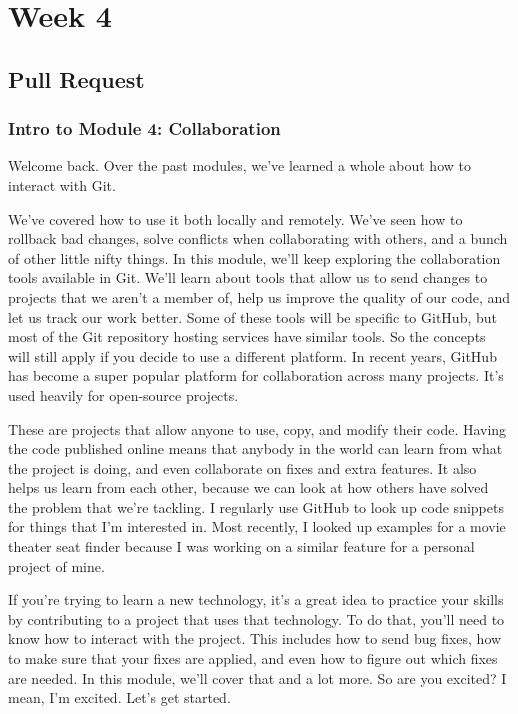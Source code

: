 %
%
%
\chapter{Week 4}

\section{Pull Request}

	\subsection{Intro to Module 4: Collaboration}
	
	Welcome back. Over the past modules, we've learned a whole about how to interact with Git.
	
	We've covered how to use it both locally and remotely. We've seen how to rollback bad changes, solve conflicts when collaborating with others, and a bunch of other little nifty things. In this module, we'll keep exploring the collaboration tools available in Git. We'll learn about tools that allow us to send changes to projects that we aren't a member of, help us improve the quality of our code, and let us track our work better. Some of these tools will be specific to GitHub, but most of the Git repository hosting services have similar tools. So the concepts will still apply if you decide to use a different platform. In recent years, GitHub has become a super popular platform for collaboration across many projects. It's used heavily for open-source projects.
	
	These are projects that allow anyone to use, copy, and modify their code. Having the code published online means that anybody in the world can learn from what the project is doing, and even collaborate on fixes and extra features. It also helps us learn from each other, because we can look at how others have solved the problem that we're tackling. I regularly use GitHub to look up code snippets for things that I'm interested in. Most recently, I looked up examples for a movie theater seat finder because I was working on a similar feature for a personal project of mine.
	
	If you're trying to learn a new technology, it's a great idea to practice your skills by contributing to a project that uses that technology. To do that, you'll need to know how to interact with the project. This includes how to send bug fixes, how to make sure that your fixes are applied, and even how to figure out which fixes are needed. In this module, we'll cover that and a lot more. So are you excited? I mean, I'm excited. Let's get started.
	
